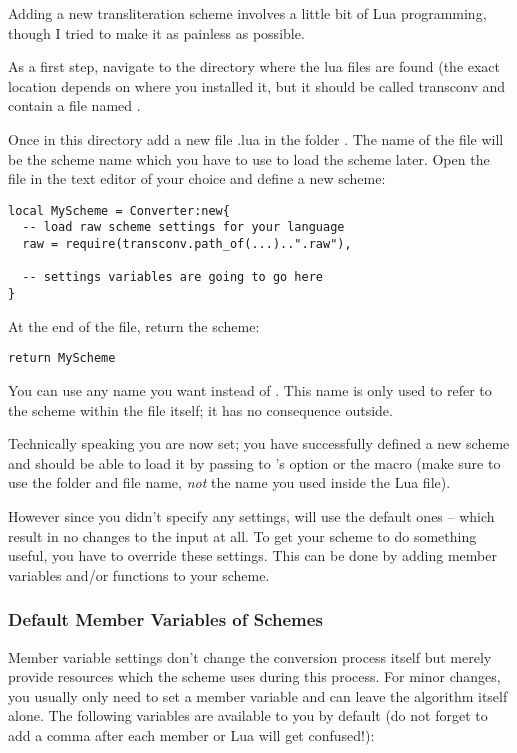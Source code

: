\documentclass{ltxdockit}
\begin{document}
Adding a new transliteration scheme involves a little bit of Lua programming,
though I tried to make it as painless as possible.

As a first step, navigate to the directory where the \transconv{} lua files are
found (the exact location depends on where you installed it, but it should be
called transconv and contain a file named .

Once in this directory add a new file .lua in the folder .
The name of the file will be the scheme name which you have to use to load the
scheme later. Open the file in the text editor of your choice and define a new
scheme:

\begin{lstlisting}
local MyScheme = Converter:new{
  -- load raw scheme settings for your language
  raw = require(transconv.path_of(...)..".raw"),

  -- settings variables are going to go here
}
\end{lstlisting}

At the end of the file, return the scheme:

\begin{lstlisting}
return MyScheme
\end{lstlisting}

You can use any name you want instead of . This name is only used
to refer to the scheme within the file itself; it has no consequence outside.

Technically speaking you are now set; you have successfully defined a new scheme
and should be able to load it by passing  to
\transconv{}'s  option or the
 macro (make sure to use the
folder and file name, \emph{not} the name you used inside the Lua file).

However since you didn't specify any settings, \transconv{} will use the
default ones -- which result in no changes to the input at all. To get your
scheme to do something useful, you have to override these settings. This can be
done by adding member variables and/or functions to your scheme.

\subsubsection{Default Member Variables of Schemes}

Member variable settings don't change the conversion process itself but merely
provide resources which the scheme uses during this process. For minor changes,
you usually only need to set a member variable and can leave the algorithm
itself alone. The following variables are available to you by default (do not
forget to add a comma after each member or Lua will get confused!):
\end{document}
